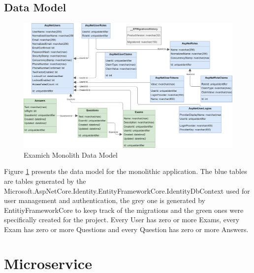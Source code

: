 \documentclass[BIF,Bachelor,nenglish]{twbook}%
\begin{document}
\subsection{Data Model}

\begin{figure} [H]
 \begin{center}
    \includegraphics[width=1.1\linewidth]{img/ExamichDataModel.png}
 \end{center}
 \caption{Examich Monolith Data Model}
 \label{datamodel}
\end{figure}

Figure \ref{datamodel} presents the data model for the monolithic application. The blue tables are tables generated by the Microsoft.AspNetCore.Identity.EntityFrameworkCore.IdentityDbContext used for user management and authentication, the grey one is generated by EntitiyFrameworkCore to keep track of the migrations and the green ones were specifically created for the project. Every User has zero or more Exams, every Exam has zero or more Questions and every Question has zero or more Answers.


\section{Microservice}
\end{document}
